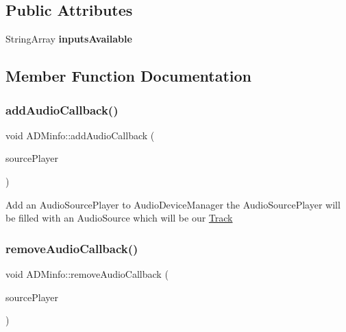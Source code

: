 \subsection*{Public Attributes}
\begin{DoxyCompactItemize}
\item 
\mbox{\label{class_a_d_minfo_a5b93fcceecb47501de53ec3ccdffd072}} 
String\+Array {\bfseries inputs\+Available}
\end{DoxyCompactItemize}


\subsection{Member Function Documentation}
\mbox{\label{class_a_d_minfo_a27279299808cf4d425f7672ff3273157}} 
\subsubsection{\texorpdfstring{addAudioCallback()}{addAudioCallback()}}
{\footnotesize\ttfamily void A\+D\+Minfo\+::add\+Audio\+Callback (\begin{DoxyParamCaption}\item[{Audio\+Source\+Player $\ast$}]{source\+Player }\end{DoxyParamCaption})}

Add an Audio\+Source\+Player to Audio\+Device\+Manager the Audio\+Source\+Player will be filled with an Audio\+Source which will be our \mbox{\hyperlink{class_track}{Track}} \mbox{\label{class_a_d_minfo_ac8fa936c018bd75d01fafd2b8c8ad3f6}} 
\subsubsection{\texorpdfstring{removeAudioCallback()}{removeAudioCallback()}}
{\footnotesize\ttfamily void A\+D\+Minfo\+::remove\+Audio\+Callback (\begin{DoxyParamCaption}\item[{Audio\+Source\+Player $\ast$}]{source\+Player }\end{DoxyParamCaption})}


